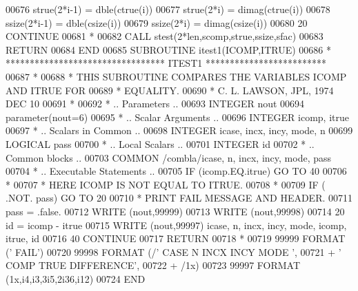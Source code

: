 \begin{DoxyCode}
00676          strue(2*i-1) = dble(ctrue(i))
00677          strue(2*i) = dimag(ctrue(i))
00678          ssize(2*i-1) = dble(csize(i))
00679          ssize(2*i) = dimag(csize(i))
00680    20 \textcolor{keywordflow}{CONTINUE}
00681 \textcolor{comment}{*}
00682       \textcolor{keyword}{CALL }stest(2*len,scomp,strue,ssize,sfac)
00683       \textcolor{keywordflow}{RETURN}
00684 \textcolor{keyword}{      END}
00685 \textcolor{keyword}{      SUBROUTINE }itest1(ICOMP,ITRUE)
00686 \textcolor{comment}{*     ********************************* ITEST1 *************************}
00687 \textcolor{comment}{*}
00688 \textcolor{comment}{*     THIS SUBROUTINE COMPARES THE VARIABLES ICOMP AND ITRUE FOR}
00689 \textcolor{comment}{*     EQUALITY.}
00690 \textcolor{comment}{*     C. L. LAWSON, JPL, 1974 DEC 10}
00691 \textcolor{comment}{*}
00692 \textcolor{comment}{*     .. Parameters ..}
00693       \textcolor{keywordtype}{INTEGER}           nout
00694       parameter(nout=6)
00695 \textcolor{comment}{*     .. Scalar Arguments ..}
00696       \textcolor{keywordtype}{INTEGER}           icomp, itrue
00697 \textcolor{comment}{*     .. Scalars in Common ..}
00698       \textcolor{keywordtype}{INTEGER}           icase, incx, incy, mode, n
00699       \textcolor{keywordtype}{LOGICAL}           pass
00700 \textcolor{comment}{*     .. Local Scalars ..}
00701       \textcolor{keywordtype}{INTEGER}           id
00702 \textcolor{comment}{*     .. Common blocks ..}
00703       \textcolor{keyword}{COMMON}            /combla/icase, n, incx, incy, mode, pass
00704 \textcolor{comment}{*     .. Executable Statements ..}
00705       \textcolor{keywordflow}{IF} (icomp.EQ.itrue) \textcolor{keywordflow}{GO TO} 40
00706 \textcolor{comment}{*}
00707 \textcolor{comment}{*                            HERE ICOMP IS NOT EQUAL TO ITRUE.}
00708 \textcolor{comment}{*}
00709       \textcolor{keywordflow}{IF} ( .NOT. pass) \textcolor{keywordflow}{GO TO} 20
00710 \textcolor{comment}{*                             PRINT FAIL MESSAGE AND HEADER.}
00711       pass = .false.
00712       \textcolor{keyword}{WRITE} (nout,99999)
00713       \textcolor{keyword}{WRITE} (nout,99998)
00714    20 id = icomp - itrue
00715       \textcolor{keyword}{WRITE} (nout,99997) icase, n, incx, incy, mode, icomp, itrue, id
00716    40 \textcolor{keywordflow}{CONTINUE}
00717       \textcolor{keywordflow}{RETURN}
00718 \textcolor{comment}{*}
00719 99999 \textcolor{keyword}{FORMAT} (\textcolor{stringliteral}{'                                       FAIL'})
00720 99998 \textcolor{keyword}{FORMAT} (/\textcolor{stringliteral}{' CASE  N INCX INCY MODE                               '},
00721      +       \textcolor{stringliteral}{' COMP                                TRUE     DIFFERENCE'},
00722      +       /1x)
00723 99997 \textcolor{keyword}{FORMAT} (1x,i4,i3,3i5,2i36,i12)
00724 \textcolor{keyword}{      END}
\end{DoxyCode}
